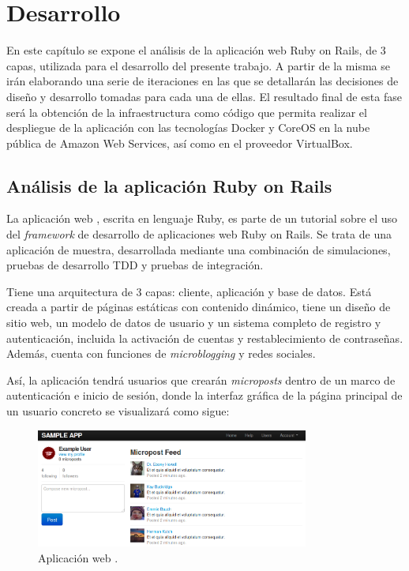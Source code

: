 \chapter{Desarrollo}
\label{cha:development}

En este capítulo se expone el análisis de la aplicación web Ruby on Rails, de 3 capas, utilizada para el desarrollo del presente trabajo. A partir de la misma se irán elaborando una serie de iteraciones en las que se detallarán las decisiones de diseño y desarrollo tomadas para cada una de ellas. El resultado final de esta fase será la obtención de la infraestructura como código que permita realizar el despliegue de la aplicación con las tecnologías Docker y CoreOS en la nube pública de Amazon Web Services, así como en el proveedor VirtualBox.

\section{Análisis de la aplicación Ruby on Rails}

La aplicación web , escrita en lenguaje Ruby, es parte de un tutorial sobre el uso del \textit{framework} de desarrollo de aplicaciones web Ruby on Rails. Se trata de una aplicación de muestra, desarrollada mediante una combinación de simulaciones, pruebas de desarrollo TDD y pruebas de integración. 

Tiene una arquitectura de 3 capas: cliente, aplicación y base de datos. Está creada a partir de páginas estáticas con contenido dinámico, tiene un diseño de sitio web, un modelo de datos de usuario y un sistema completo de registro y autenticación, incluida la activación de cuentas y restablecimiento de contraseñas. Además, cuenta con funciones de \textit{microblogging} y redes sociales. 

Así, la aplicación tendrá usuarios que crearán \textit{microposts} dentro de un marco de autenticación e inicio de sesión, donde la interfaz gráfica de la página principal de un usuario concreto se visualizará como sigue:

\begin{figure}[H]
\centering
\includegraphics[width=0.8\textwidth]{images/figures/sampleapp.png}
\caption{Aplicación web .}
\end{figure}

